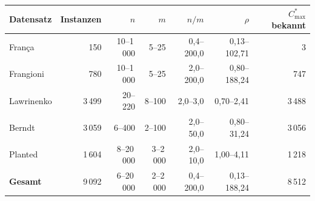 \begin{tabular}{l r r r r r r}
\toprule
Datensatz & Instanzen & $n$ & $m$ & $n/m$ & $\rho$ & $C^{*}_{\max}$ bekannt \\
\midrule
França & 150 & 10--1\,000 & 5--25 & 0{,}4--200{,}0 & 0{,}13--102{,}71 & 3 \\
Frangioni & 780 & 10--1\,000 & 5--25 & 2{,}0--200{,}0 & 0{,}80--188{,}24 & 747 \\
Lawrinenko & 3\,499 & 20--220 & 8--100 & 2{,}0--3{,}0 & 0{,}70--2{,}41 & 3\,488 \\
Berndt & 3\,059 & 6--400 & 2--100 & 2{,}0--50{,}0 & 0{,}80--31{,}24 & 3\,056 \\
Planted & 1\,604 & 8--20\,000 & 3--2\,000 & 2{,}0--10{,}0 & 1{,}00--4{,}11 & 1\,218 \\
\midrule
\textbf{Gesamt} & 9\,092 & 6--20\,000 & 2--2\,000 & 0{,}4--200{,}0 & 0{,}13--188{,}24 & 8\,512 \\
\bottomrule
\end{tabular}
